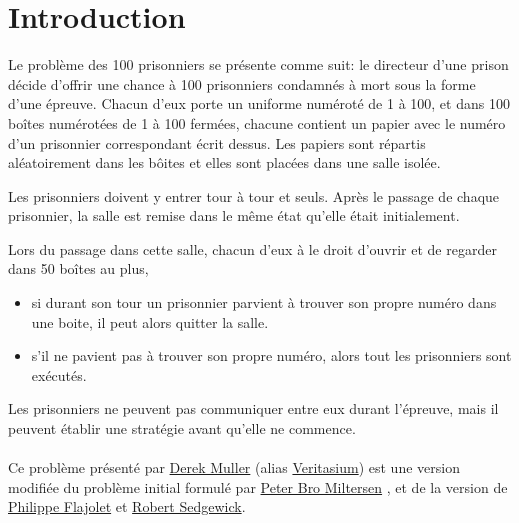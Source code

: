\section{Introduction}

Le problème des 100 prisonniers \cite{100PrisonersProblem2023} se présente
comme suit:
le directeur d'une prison décide d'offrir une chance à 100 prisonniers
condamnés à mort sous la forme d'une épreuve.
Chacun d'eux porte un uniforme numéroté de 1 à 100, et dans 100 boîtes
numérotées de 1 à 100 fermées, chacune contient un papier avec le numéro d'un
prisonnier correspondant écrit dessus.
Les papiers sont répartis aléatoirement dans les bôites et elles sont placées dans une
salle isolée.

Les prisonniers doivent y entrer tour à tour et seuls.
Après le passage de chaque prisonnier, la salle est remise dans le même
état qu'elle était initialement.

Lors du passage dans cette salle, chacun d'eux à le droit d'ouvrir
et de regarder dans 50 boîtes au plus,

\begin{itemize}
	\item
	      si durant son tour un prisonnier parvient à trouver son propre numéro
	      dans une boite, il peut alors quitter la salle.
	\item
	      s'il ne pavient pas à trouver son propre numéro, alors tout les
	      prisonniers sont exécutés.
\end{itemize}

Les prisonniers ne peuvent pas communiquer entre eux durant l'épreuve,
mais il peuvent établir une stratégie avant qu'elle ne commence.\\\\
Ce problème présenté \cite{veritasiumRiddleThatSeems2022} par
\href{https://www.veritasium.com/about}{Derek Muller}
(alias \href{https://www.youtube.com/@veritasium}{Veritasium})
est une version modifiée du problème
initial \cite{miltersenCellProbeComplexity2007} formulé par
\href{https://pure.au.dk/portal/en/persons/bromille%40cs.au.dk}{Peter Bro Miltersen}
, et de la version \cite{flajoletAnalyticCombinatorics2009} de
\href{https://fr.wikipedia.org/wiki/Philippe_Flajolet}{Philippe Flajolet}
et \href{https://sedgewick.io/}{Robert Sedgewick}.

